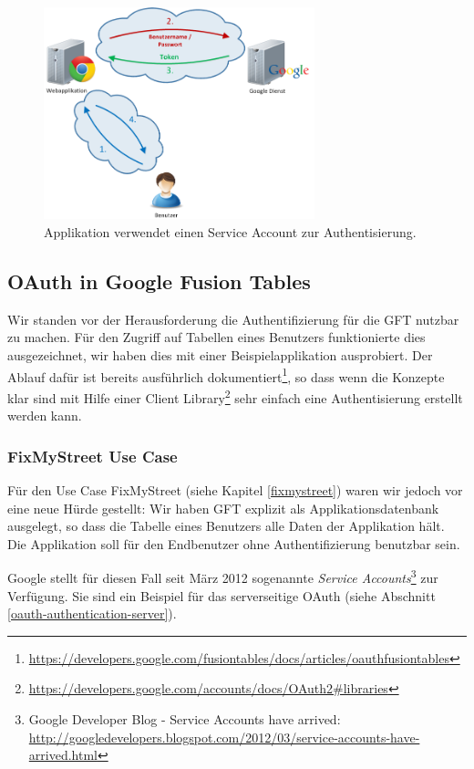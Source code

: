 \begin{figure}[!ht]
	\centering
	\includegraphics[width=0.7\textwidth]{images/oauth/oauth-serviceaccount}
	\caption{Applikation verwendet einen Service Account zur Authentisierung.}
	\label{oauth-serviceaccount}
\end{figure}

\subsection{OAuth in Google Fusion Tables}
Wir standen vor der Herausforderung die Authentifizierung für die GFT nutzbar zu machen. Für den Zugriff auf Tabellen eines Benutzers funktionierte dies ausgezeichnet, wir haben dies mit einer Beispielapplikation ausprobiert. Der Ablauf dafür ist bereits ausführlich dokumentiert\footnote{\url{https://developers.google.com/fusiontables/docs/articles/oauthfusiontables}}, so dass wenn die Konzepte klar sind mit Hilfe einer Client Library\footnote{\url{https://developers.google.com/accounts/docs/OAuth2\#libraries}} sehr einfach eine Authentisierung erstellt werden kann.

\subsubsection{FixMyStreet Use Case}
Für den Use Case FixMyStreet (siehe Kapitel \ref{fixmystreet}) waren wir jedoch vor eine neue Hürde gestellt: Wir haben GFT explizit als Applikationsdatenbank ausgelegt, so dass die Tabelle eines Benutzers alle Daten der Applikation hält. Die Applikation soll für den Endbenutzer ohne Authentifizierung benutzbar sein.

Google stellt für diesen Fall seit März 2012 sogenannte \emph{Service Accounts}\footnote{Google Developer Blog - Service Accounts have arrived: \url{http://googledevelopers.blogspot.com/2012/03/service-accounts-have-arrived.html}} zur Verfügung. Sie sind ein Beispiel für das serverseitige \gls{OAuth} (siehe Abschnitt \ref{oauth-authentication-server}).

